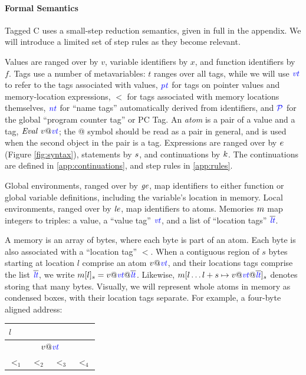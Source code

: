 \documentclass[acmsmall,review,anonymous]{acmart}\settopmatter{printfolios=true,printccs=false,printacmref=false}
\begin{document}
\paragraph{Formal Semantics}
\label{sec:semantics}

Tagged C uses a small-step reduction semantics, given in full in the appendix. We will introduce
a limited set of step rules as they become relevant.

Values are ranged over by \(v\), variable identifiers by \(x\), and function identifiers by \(f\).
Tags use a number of metavariables: \(t\) ranges over all tags, while we will use
\(\mathit{\color{blue} vt}\) to refer to the tags associated with values, \(\mathit{\color{blue} pt}\) for tags on pointer values
and memory-location expressions, \(\lt\) for tags associated with memory locations themselves,
\(\mathit{\color{blue} nt}\) for ``name tags'' automatically derived from identifiers, and \(\mathcal{\color{blue} P}\) for the
global ``program counter tag'' or PC Tag.
An {\it atom} is a pair of a value and a tag, \(\mathit{Eval} ~ v@\mathit{\color{blue} vt}\); the @ symbol should be read
as a pair in general, and is used when the second object in the pair is a tag.
Expressions are ranged over by \(e\) (Figure \ref{fig:syntax}),
statements by \(s\), and continuations by \(k\).
The continuations are defined in \cref{app:continuations}, and step rules in \cref{app:rules}.

Global environments, ranged over by \(\mathit{ge}\), map identifiers to either function
or global variable definitions, including the variable's location in memory. Local environments,
ranged over by \(\mathit{le}\), map identifiers to atoms.
Memories \(m\) map integers to
triples: a value, a ``value tag'' \(\mathit{\color{blue} vt}\), and a list of ``location tags'' \(\overline{\color{blue} \mathit{\color{blue} lt}}\).

A memory is an array of bytes, where each byte is part of an atom.
Each byte is also associated with a ``location tag'' \(\lt\). When a contiguous region of \(s\) bytes
starting at location \(l\) comprise an atom \(v@\mathit{\color{blue} vt}\), and their locations tags comprise the list \(\overline{\color{blue} \mathit{\color{blue} lt}}\),
we write \(m[l]_s = v@\mathit{\color{blue} vt} @\overline{\color{blue} \mathit{\color{blue} lt}}\). Likewise, \(m[l \dots l + s \mapsto v@\mathit{\color{blue} vt} @ \overline{\color{blue} \mathit{\color{blue} lt}}]_s\)
denotes storing that many bytes. Visually, we will represent whole atoms in memory as condensed boxes,
with their location tags separate. For example, a four-byte aligned address:

\begin{tabular}{|c|c|c|c|}
  \multicolumn{4}{l}{\(l\)} \\
  \hline
  \multicolumn{4}{|c|}{\(v @ \mathit{\color{blue} vt}\)} \\
  \hline
  \(\lt_1\) & \(\lt_2\) & \(\lt_3\) & \(\lt_4\) \\
  \hline
\end{tabular}
\end{document}
